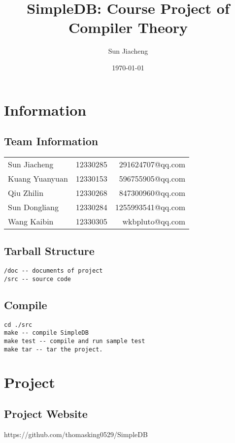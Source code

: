 \documentclass[12pt,a4paper,oneside,draft]{report}
\begin{document}
\title{SimpleDB: Course Project of Compiler Theory}
\date{\today}
\author{Sun Jiacheng}
\maketitle

\chapter{Information}
\section{Team Information}
\begin{tabular}{l c r}
Sun Jiacheng & 12330285 & 291624707@qq.com\\
Kuang Yuanyuan & 12330153 & 596755905@qq.com\\
Qiu Zhilin & 12330268 & 847300960@qq.com\\
Sun Dongliang & 12330284 & 1255993541@qq.com\\
Wang Kaibin & 12330305 & wkbpluto@qq.com\\
\end{tabular}

\section{Tarball Structure}
\begin{verbatim}
/doc -- documents of project
/src -- source code
\end{verbatim}

\section{Compile}
\begin{verbatim}
cd ./src
make -- compile SimpleDB
make test -- compile and run sample test
make tar -- tar the project.
\end{verbatim}

\chapter{Project}

\section{Project Website}
https://github.com/thomasking0529/SimpleDB\\
\end{document}
